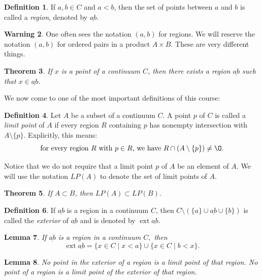 \documentclass[11pt]{article}
\renewcommand{\emptyset}{\O}
\renewcommand{\_}[1]{\underline{ #1 }}
\DeclareMathOperator{\ext}{ext}
\newtheorem{theorem}{Theorem}[section]
\newtheorem{lemma}[theorem]{Lemma}
\theoremstyle{definition}
\newtheorem{definition}[theorem]{Definition}
\newtheorem{warning}[theorem]{Warning}
\numberwithin{equation}{subsection}
\begin{document}
\begin{definition} If $a,b\in C$ and $a < b$, then the set of points between $a$ and $b$ is called a \emph{region}, denoted by $\_{ab}$.  
\end{definition}

\begin{warning}  One often sees the notation $(a, b)$ for regions.  We will reserve the notation $(a, b)$ for ordered pairs in a product $A \times B$.  These are very different things.  
\end{warning}

\begin{theorem} If $x$ is a point of a continuum $C$, then there exists a region $\_{ab}$ such that $x \in \_{ab}$.
\end{theorem}

We now come to one of the most important definitions of this course:

\begin{definition}
Let $A$ be a subset of a continuum $C$.  A point $p$ of $C$ is called a \emph{limit point} of $A$ if every region $R$ containing $p$ has nonempty intersection with $A \setminus \{p\}$.  Explicitly, this means:
\[
\text{for every region $R$ with $p \in R$, we have $R \cap (A \setminus \{p \}) \neq \emptyset$.}
\]
\end{definition}

Notice that we do not require that a limit point $p$ of $A$ be an element of $A$. We will use the notation $LP(A)$ to denote the set of limit points of $A.$ 

\begin{theorem} If $A \subset B$, then $LP(A)\subset LP(B).$
\end{theorem}



\begin{definition} If $\_{ab}$ is a region in a continuum $C$, then $C \setminus (\{a\} \cup \_{ab} \cup \{b\})$ is called the \emph{exterior} of $\_{ab}$ and is denoted by $\ext{\_{ab}}$.
\end{definition}


\begin{lemma} If $\_{ab}$ is a region in a continuum $C,$ then
$$\ext{\_{ab}}=\{x\in C\mid x<a\}\cup\{x\in C\mid b<x\}.$$
\end{lemma}



\begin{lemma}  No point in the exterior of a region is a limit point of that region.  No point of a region is a limit point of the exterior of that region.
\end{lemma}
\end{document}
